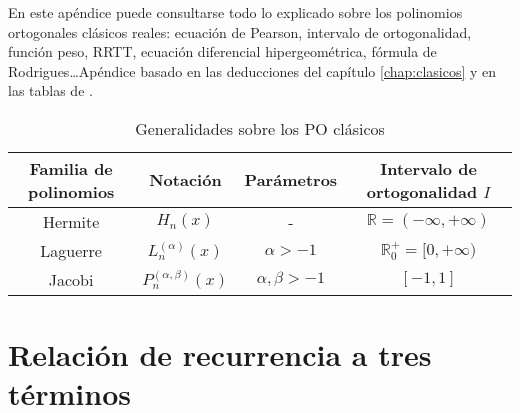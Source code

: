 
En este apéndice puede consultarse todo lo explicado sobre los polinomios ortogonales clásicos reales: ecuación de Pearson, intervalo de ortogonalidad, función peso, RRTT, ecuación diferencial hipergeométrica, fórmula de Rodrigues\dots Apéndice basado en las deducciones del capítulo \ref{chap:clasicos} y en las tablas de \cite[Ch. XXII]{abramowitz-stegun}.

\begin{table}[h]
    \centering
    \begin{tabular}{cccc}
    \hline
    \textbf{Familia de polinomios} & \textbf{Notación}                  & \textbf{Parámetros}        & \textbf{Intervalo de ortogonalidad} $I$                                               \\ \hline\hline
    Hermite               & $H_n(x)$                  & -                 & $\mathbb R = (-\infty,+\infty)$ \\ \hline
    Laguerre              & $L_n^{(\alpha)}(x)$       & $\alpha>-1$       & $\mathbb R^+_0 = [0,+\infty)$                                                \\ \hline
    Jacobi                & $P_n^{(\alpha,\beta)}(x)$ & $\alpha,\beta>-1$ & $[-1,1]$                                                                     \\ \hline
    \end{tabular}
    \caption{Generalidades sobre los PO clásicos}
    \label{tab:generalidades-clasicos}
    \end{table}

\section{Relación de recurrencia a tres términos}

